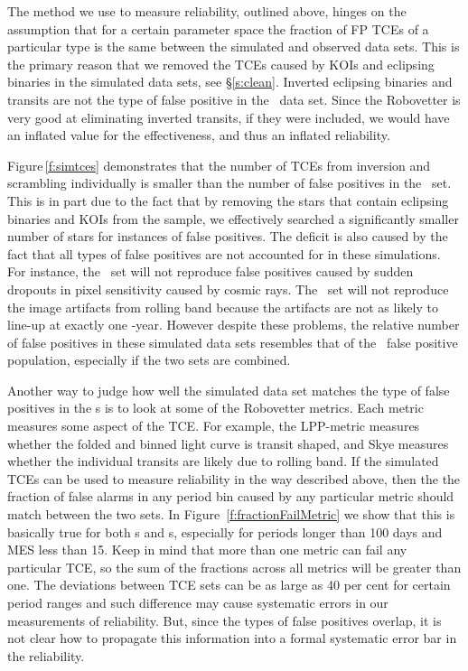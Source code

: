 The method we use to measure reliability, outlined above, hinges on the assumption that for a certain parameter space the fraction of FP TCEs of a particular type is the same between the simulated and observed data sets.  This is the primary reason that we removed the TCEs caused by KOIs and eclipsing binaries in the simulated data sets, see \S\ref{s:clean}. Inverted eclipsing binaries and transits are not the type of false positive in the \opstce\ data set.  Since the Robovetter is very good at eliminating inverted transits, if they were included, we would have an inflated value for the effectiveness, and thus an inflated reliability. 

Figure\,\ref{f:simtces} demonstrates that the number of TCEs from inversion and scrambling individually is smaller than the number of false positives in the \opstce\ set. This is in part due to the fact that by removing the stars that contain eclipsing binaries and KOIs from the sample, we effectively searched a significantly smaller number of stars for instances of false positives. The deficit is also caused by the fact that all types of false positives are not accounted for in these simulations. For instance, the \invtce\ set will not reproduce false positives caused by sudden dropouts in pixel sensitivity caused by cosmic rays. The \scrtce\ set will not reproduce the image artifacts from rolling band because the artifacts are not as likely to line-up at exactly one \Kepler -year.  However despite these problems, the relative number of false positives in these simulated data sets resembles that of the \opstce\ false positive population, especially if the two sets are combined.

Another way to judge how well the simulated data set matches the type of false positives in the \opstce s is to look at some of the Robovetter metrics.  Each metric measures some aspect of the TCE. For example, the LPP-metric measures whether the folded and binned light curve is transit shaped, and Skye measures whether the individual transits are likely due to rolling band.  If the simulated TCEs can be used to measure reliability in the way described above, then the the fraction of false alarms in any period bin caused by any particular metric should match between the two sets.  In Figure~\ref{f:fractionFailMetric} we show that this is basically true for both \invtce s and \scrtce s, especially for periods longer than 100 days and MES less than 15.  Keep in mind that more than one metric can fail any particular TCE, so the sum of the fractions across all metrics will be greater than one.  The deviations between TCE sets can be as large as 40 per cent for certain period ranges and such difference may cause systematic errors in our measurements of reliability.  But, since the types of false positives overlap, it is not clear how to propagate this information into a formal systematic error bar in the reliability.  

